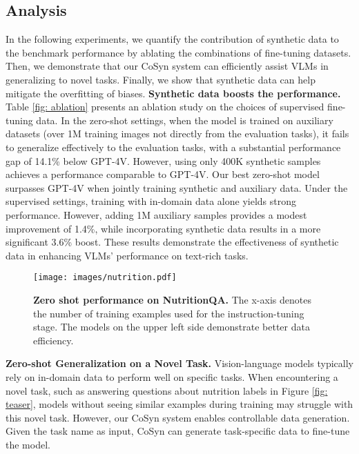 \subsection{Analysis} \label{sec: analysis}
In the following experiments, we quantify the contribution of synthetic data to the benchmark performance by ablating the combinations of fine-tuning datasets. 
Then, we demonstrate that our CoSyn system can efficiently assist VLMs in generalizing to novel tasks. 
Finally, we show that synthetic data can help mitigate the overfitting of biases.
\smallbreak
\noindent \textbf{Synthetic data boosts the performance.} Table \ref{fig: ablation} presents an ablation study on the choices of supervised fine-tuning data. 
In the zero-shot settings, when the model is trained on auxiliary datasets (over 1M training images not directly from the evaluation tasks), it fails to generalize effectively to the evaluation tasks, with a substantial performance gap of 14.1\% below GPT-4V.
However, using only 400K synthetic samples achieves a performance comparable to GPT-4V. 
Our best zero-shot model surpasses GPT-4V when jointly training synthetic and auxiliary data.
Under the supervised settings, training with in-domain data alone yields strong performance. 
However, adding 1M auxiliary samples provides a modest improvement of 1.4\%, while incorporating synthetic data results in a more significant 3.6\% boost. 
These results demonstrate the effectiveness of synthetic data in enhancing VLMs' performance on text-rich tasks.

\begin{figure}[!t]
    \centering
    \texttt{[image: images/nutrition.pdf]}
    \vspace{-.6cm}
    \caption{\textbf{Zero shot performance on NutritionQA.} The x-axis denotes the number of training examples used for the instruction-tuning stage. The models on the upper left side demonstrate better data efficiency.}
    \label{fig: nutrition}
    \vspace{-0.3cm}
\end{figure}

\smallbreak
\noindent \textbf{Zero-shot Generalization on a Novel Task.} Vision-language models typically rely on in-domain data to perform well on specific tasks. 
When encountering a novel task, such as answering questions about nutrition labels in Figure \ref{fig: teaser}, models without seeing similar examples during training may struggle with this novel task. 
However, our CoSyn system enables controllable data generation. 
Given the task name as input, CoSyn can generate task-specific data to fine-tune the model.

